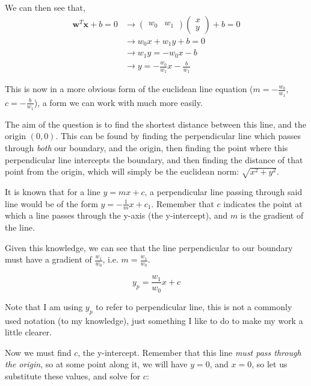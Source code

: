 \documentclass[a4paper]{article}
\begin{document}
We can then see that,
\begin{equation}\begin{split}
		\mathbf{w}^T\mathbf{x}+b=0 &\to \left(\begin{matrix}w_0 & w_1\end{matrix}\right)\left(\begin{matrix}x \\ y\end{matrix}\right)+b=0 \\
		&\to w_0x + w_1y + b = 0 \\
		&\to w_1y = -w_0x-b \\
		&\to y = -\frac{w_0}{w_1}x-\frac{b}{w_1}
	\end{split}\end{equation}

This is now in a more obvious form of the euclidean line equation ($m=-\frac{w_0}{w_1}$, $c=-\frac{b}{w_1}$), a form we can work with much more easily.

The aim of the question is to find the shortest distance between this line, and the origin $(0, 0)$. This can be found by
finding the perpendicular line which passes through \textit{both} our boundary, and the origin, then finding the point
where this perpendicular line intercepts the boundary, and then finding the distance of that point from the origin, which
will simply be the euclidean norm: $\sqrt{x^2+y^2}$.

It is known that for a line $y=mx+c$, a perpendicular line passing through said line would be of the form $y=-\frac{1}{m}x+c_1$.
Remember that $c$ indicates the point at which a line passes through the y-axis (the y-intercept), and $m$ is the gradient of the line.

Given this knowledge, we can see that the line perpendicular to our boundary must have a gradient of $\frac{w_1}{w_0}$, i.e. $m=\frac{w_1}{w_0}$.

\begin{equation}
	y_p=\frac{w_1}{w_0}x+c
\end{equation}

Note that I am using $y_p$ to refer to perpendicular line, this is not a commonly used notation (to my knowledge), just something I like
to do to make my work a little clearer.

Now we must find $c$, the y-intercept. Remember that this line \textit{must pass through the origin}, so at some point along it, we will have
$y=0$, and $x=0$, so let us substitute these values, and solve for $c$:
\end{document}

